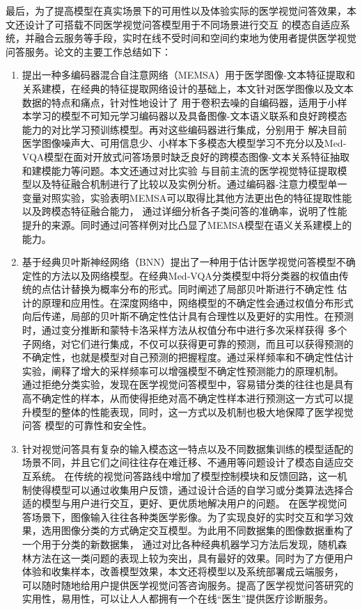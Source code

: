 最后，为了提高模型在真实场景下的可用性以及体验实际的医学视觉问答效果，本文还设计了可搭载不同医学视觉问答模型用于不同场景进行交互
的模态自适应系统，并融合云服务等手段，实时在线不受时间和空间约束地为使用者提供医学视觉问答服务。论文的主要工作总结如下：
\begin{enumerate}[topsep = 0 pt, itemsep= 0 pt, parsep=0pt, partopsep=0pt, leftmargin=44pt, itemindent=0pt, labelsep=6pt, label=(\arabic*)]
    \item 提出一种多编码器混合自注意网络（MEMSA）用于医学图像-文本特征提取和关系建模，在经典的特征提取网络设计的基础上，本文针对医学图像以及文本数据的特点和痛点，针对性地设计了
    用于卷积去噪的自编码器，适用于小样本学习的模型不可知元学习编码器以及具备图像-文本语义联系和良好跨模态能力的对比学习预训练模型。再对这些编码器进行集成，分别用于
    解决目前医学图像噪声大、可用信息少、小样本下多模态大模型学习不充分以及Med-VQA模型在面对开放式问答场景时缺乏良好的跨模态图像-文本关系特征抽取和建模能力等问题。本文还通过对比实验
    与目前主流的医学视觉特征提取模型以及特征融合机制进行了比较以及实例分析。通过编码器-注意力模型单一变量对照实验，实验表明MEMSA可以取得比其他方法更出色的特征提取性能以及跨模态特征融合能力，
    通过详细分析各子类问答的准确率，说明了性能提升的来源。同时通过问答样例对比凸显了MEMSA模型在语义关系建模上的能力。
    \item 基于经典贝叶斯神经网络（BNN）提出了一种用于估计医学视觉问答模型不确定性的方法以及网络模型。在经典Med-VQA分类模型中将分类器的权值由传统的点估计替换为概率分布的形式。同时阐述了局部贝叶斯进行不确定性
    估计的原理和应用性。在深度网络中，网络模型的不确定性会通过权值分布形式向后传递，局部的贝叶斯不确定性估计具有合理性以及更好的实用性。在预测时，通过变分推断和蒙特卡洛采样方法从权值分布中进行多次采样获得
    多个子网络，对它们进行集成，不仅可以获得更可靠的预测，而且可以获得预测的不确定性，也就是模型对自己预测的把握程度。通过采样频率和不确定性估计实验，阐释了增大的采样频率可以增强模型不确定性预测能力的原理机制。
    通过拒绝分类实验，发现在医学视觉问答模型中，容易错分类的往往也是具有高不确定性的样本，从而使得拒绝对高不确定性样本进行预测这一方式可以提升模型的整体的性能表现，同时，这一方式以及机制也极大地保障了医学视觉问答
    模型的可靠性和安全性。
    \item 针对视觉问答具有复杂的输入模态这一特点以及不同数据集训练的模型适配的场景不同，并且它们之间往往存在难迁移、不通用等问题设计了模态自适应交互系统。
    在传统的视觉问答路线中增加了模型控制模块和反馈回路，这一机制使得模型可以通过收集用户反馈，通过设计合适的自学习或分类算法选择合适的模型与用户进行交互，更好、更优质地解决用户的问题。
    在医学视觉问答场景下，图像输入往往各种类医学影像。为了实现良好的实时交互和学习效果，选用图像分类的方式确定交互模型。为此用不同数据集的图像数据重构了一个用于分类的新数据集，
    通过对比各种经典机器学习方法后发现，随机森林方法在这一类问题的表现上较为突出，具有最好的效果。同时为了方便用户体验和收集样本，改善模型效果，本文还将模型以及系统部署成云端服务，
    可以随时随地给用户提供医学视觉问答咨询服务。提高了医学视觉问答研究的实用性，易用性，可以让人人都拥有一个在线“医生”提供医疗诊断服务。
\end{enumerate}

